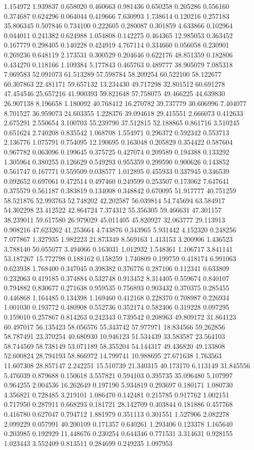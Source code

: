 1.154972
1.939837
0.658020
0.460663
0.981436
0.650258
0.205286
0.556160
0.374687
0.624296
0.064044
0.419666
7.630993
1.738614
0.120216
0.257183
35.806345
0.507846
0.734100
0.222605
0.280087
0.301859
4.633866
0.102964
0.044011
0.241382
0.624988
1.054808
0.142275
0.464365
12.985053
0.363452
0.167779
0.298405
0.140228
0.424919
4.767114
0.334660
0.056058
0.230901
0.269236
0.648119
2.173531
0.300529
0.204646
0.622176
48.851359
0.182806
0.434270
0.118166
1.109384
5.177843
0.465763
0.489777
38.905079
7.085318
7.069583
52.091073
61.513289
57.598784
58.209254
60.522100
58.122677
60.307863
22.481171
59.657132
13.234430
49.717298
32.801512
60.691278
47.454546
25.657216
41.900393
59.821648
57.758075
49.466225
44.639830
26.907138
8.196658
1.180092
40.768412
16.270782
39.737779
30.606996
7.404077
8.701527
36.959073
24.603355
1.228376
39.094618
29.415551
2.666073
0.412633
2.675291
2.550654
3.100703
55.239790
37.512815
52.188865
0.861716
3.510245
0.651624
2.740208
0.835542
1.068708
1.554971
0.296372
0.592342
0.553713
2.136776
1.075791
0.754095
12.190695
0.163048
0.205829
0.354422
0.587604
0.967782
0.063096
0.199645
0.375725
0.427074
0.209589
0.194388
0.133292
1.305964
0.380255
0.126629
0.549293
0.955359
0.299590
0.900626
0.143852
0.561747
0.167771
0.559509
0.038577
1.012895
0.455933
0.337945
0.346539
0.092652
0.697061
0.472514
0.497460
0.249599
0.253507
0.173062
7.647641
0.375579
0.561187
0.383819
0.134008
0.348842
0.670095
51.917777
40.751259
58.521876
52.993763
52.748202
42.202587
56.039814
54.745694
63.584917
54.302298
23.412522
42.864724
7.374312
55.356305
59.466631
47.301157
38.239011
59.617580
26.979029
45.011405
45.820927
32.063777
29.113913
0.908216
47.623262
41.253664
4.743876
0.343965
5.931442
4.152320
0.248256
7.077867
1.327935
1.982223
21.873349
8.569163
1.413153
3.200906
1.436523
3.788140
50.055077
3.494066
0.163031
1.012932
1.548361
1.106717
3.841141
53.187267
15.772798
0.188162
0.158259
1.740809
0.199759
0.418174
6.991063
0.623938
1.768400
0.347045
0.398382
0.376776
0.287106
0.112341
0.633809
0.232063
0.419185
0.374884
0.532748
0.913452
8.314405
0.559674
0.840107
0.794882
0.830677
0.271638
0.959535
0.756893
0.903432
0.370375
0.285455
0.446868
1.164485
0.134398
1.169460
0.412168
0.228370
0.708987
0.226934
1.001030
0.193772
0.480908
0.552736
0.352174
0.582406
0.319228
0.097295
0.159010
0.257867
0.814263
0.242343
0.739542
0.208963
49.809172
31.864123
60.497017
56.135423
58.056576
55.343742
57.977971
18.834566
59.262856
58.787491
23.370254
40.680930
10.946123
51.534439
33.583587
23.564103
58.744569
58.738149
53.071189
58.355204
54.144317
49.436820
49.133808
52.600824
28.794193
58.866972
14.799741
10.988695
27.671638
1.763563
11.607308
28.857147
2.242251
15.510739
21.340315
40.173170
6.113149
31.845556
5.476039
0.879688
0.150618
3.557821
0.594103
0.395735
35.096480
5.107997
0.964255
2.004536
16.262649
0.197190
5.934819
0.293697
0.180171
1.080730
4.356821
0.728485
3.219101
1.086470
0.142481
0.215785
0.917762
1.002151
0.717950
0.287911
0.668293
0.181721
28.142709
0.403844
0.181886
0.457768
0.416780
0.627047
0.794712
1.881979
0.351113
0.301551
1.527906
2.082278
2.099229
0.057991
40.200109
0.171357
0.640261
1.293406
0.123378
1.165640
0.203985
0.192929
11.448676
0.230254
0.644346
0.771531
3.314631
0.928155
1.023443
3.552409
0.813511
0.284699
0.249235
1.097953
